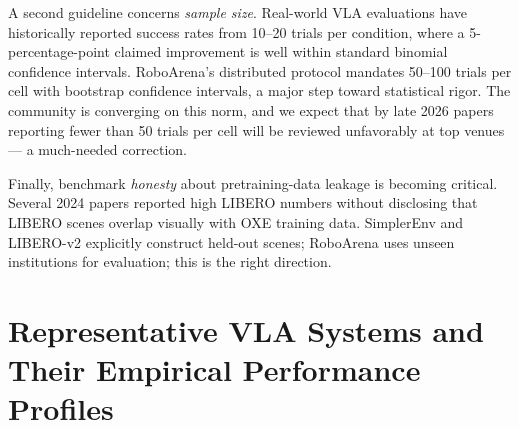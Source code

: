 A second guideline concerns \emph{sample size}. Real-world VLA evaluations have historically reported success rates from 10--20 trials per condition, where a 5-percentage-point claimed improvement is well within standard binomial confidence intervals. RoboArena's distributed protocol mandates 50--100 trials per cell with bootstrap confidence intervals, a major step toward statistical rigor. The community is converging on this norm, and we expect that by late 2026 papers reporting fewer than 50 trials per cell will be reviewed unfavorably at top venues --- a much-needed correction.

Finally, benchmark \emph{honesty} about pretraining-data leakage is becoming critical. Several 2024 papers reported high LIBERO numbers without disclosing that LIBERO scenes overlap visually with OXE training data. SimplerEnv and LIBERO-v2 explicitly construct held-out scenes; RoboArena uses unseen institutions for evaluation; this is the right direction.

\section{Representative VLA Systems and Their Empirical Performance Profiles}\label{representative-vla-systems-and-their-empirical-performance-profiles}

